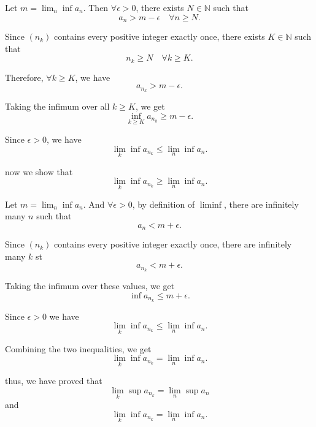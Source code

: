 \documentclass{article}
\begin{document}
    Let \(m = \lim_{n} \inf a_n\). Then  \(\forall \epsilon > 0\), there exists \(N \in \mathbb{N}\) such that
    \[
    a_n > m - \epsilon \quad \forall n \geq N.
    \]
    
    Since \((n_k)\) contains every positive integer exactly once, there exists \(K \in \mathbb{N}\) such that
    \[
    n_k \geq N \quad \forall k \geq K.
    \]
    
    Therefore, \(\forall k \geq K\), we have
    \[
    a_{n_k} > m - \epsilon.
    \]
    
    Taking the infimum over all \(k \geq K\), we get
    \[
    \inf_{k \geq K} a_{n_k} \geq m - \epsilon.
    \]
    
    Since \(\epsilon > 0\), we have
    \[
    \lim_{k} \inf a_{n_k} \leq \lim_{n} \inf a_n.
    \]
    
    now we show that
    \[
    \lim_{k} \inf a_{n_k} \geq \lim_{n} \inf a_n.
    \]
    
    Let \(m = \lim_{n} \inf a_n\). And \(\forall \epsilon > 0\), by definition of \(\liminf\), there are infinitely many \(n\) such that
    \[
    a_n < m + \epsilon.
    \]
    
    Since \((n_k)\) contains every positive integer exactly once, there are infinitely many \(k\) st
    \[
    a_{n_k} < m + \epsilon.
    \]
    
    Taking the infimum over these values, we get
    \[
    \inf a_{n_k} \leq m + \epsilon.
    \]
    
    Since \(\epsilon > 0\) we have
    \[
    \lim_{k} \inf a_{n_k} \leq \lim_{n} \inf a_n.
    \]
    
    Combining the two inequalities, we get
    \[
    \lim_{k} \inf a_{n_k} = \lim_{n} \inf a_n.
    \]
    
    thus, we have proved that
    \[
    \lim_{k} \sup a_{n_k} = \lim_{n} \sup a_n
    \]
    and
    \[
    \lim_{k} \inf a_{n_k} = \lim_{n} \inf a_n.
    \]
    
\end{document}
